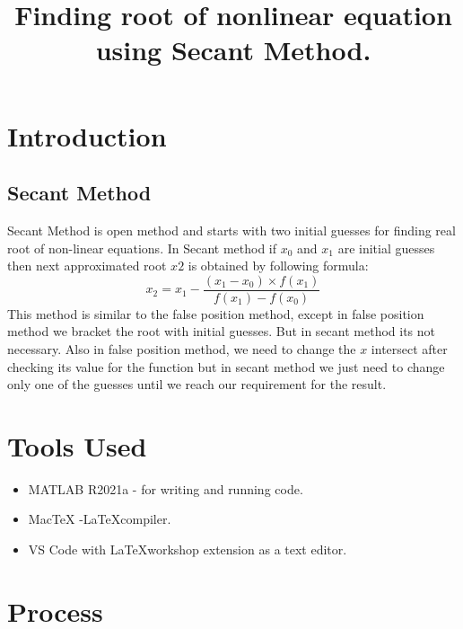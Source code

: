 \documentclass[12pt]{article}
\begin{document}


\pagebreak
\clearpage
\title{Finding root of nonlinear equation using Secant Method.}
\author{}
\date{}
\maketitle

\section*{Introduction}
\subsection*{Secant Method}
Secant Method is open method and starts with two initial guesses for finding real root of non-linear equations.
In Secant method if $x_0$ and $x_1$ are initial guesses then next approximated root $x2$ is obtained by following formula:\cite{sec}
\[x_2 = x_1 - \frac{(x_1-x_0) \times f(x_1) }{f(x_1) - f(x_0)}\]
This method is similar to the false position method, except in false position method we bracket the root with initial guesses. But in secant method its not necessary. Also in false position method, we need to change the $x$ intersect after checking its value for the function but in secant method we just need to change only one of the guesses until we reach our requirement for the result.



\section*{Tools Used}
\begin{itemize}
    \item MATLAB R2021a - for writing and running code.
    \item MacTeX -\LaTeX  compiler.
    \item VS Code with \LaTeX workshop extension as a text editor.
\end{itemize}

\section*{Process}
\end{document}
